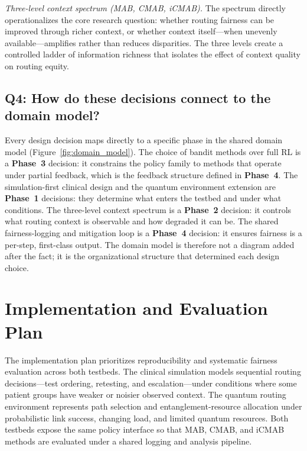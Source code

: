 \documentclass{IEEEtran}
\begin{document}
\textit{Three-level context spectrum (MAB, CMAB, iCMAB).} The spectrum
directly operationalizes the core research question: whether routing fairness
can be improved through richer context, or whether context itself---when
unevenly available---amplifies rather than reduces disparities. The three
levels create a controlled ladder of information richness that isolates the
effect of context quality on routing equity.

\subsection{Q4: How do these decisions connect to the domain model?}
Every design decision maps directly to a specific phase in the shared domain
model (Figure~\ref{fig:domain_model}). The choice of bandit methods over
full RL is a \textbf{Phase~3} decision: it constrains the policy family to
methods that operate under partial feedback, which is the feedback structure
defined in \textbf{Phase~4}. The simulation-first clinical design and the
quantum environment extension are \textbf{Phase~1} decisions: they determine
what enters the testbed and under what conditions. The three-level context
spectrum is a \textbf{Phase~2} decision: it controls what routing context is
observable and how degraded it can be. The shared fairness-logging and
mitigation loop is a \textbf{Phase~4} decision: it ensures fairness is a
per-step, first-class output. The domain model is therefore not a diagram
added after the fact; it is the organizational structure that determined
each design choice.

\section{Implementation and Evaluation Plan}

The implementation plan prioritizes reproducibility and systematic fairness
evaluation across both testbeds. The clinical simulation models sequential
routing decisions---test ordering, retesting, and escalation---under
conditions where some patient groups have weaker or noisier observed context.
The quantum routing environment represents path selection and
entanglement-resource allocation under probabilistic link success, changing
load, and limited quantum resources. Both testbeds expose the same policy
interface so that MAB, CMAB, and iCMAB methods are evaluated under a shared
logging and analysis pipeline.
\end{document}
